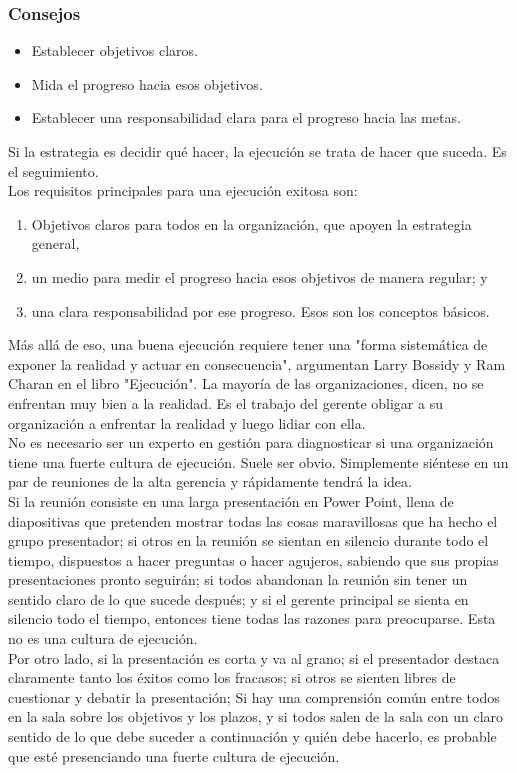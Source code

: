 \documentclass[10pt]{book}
\begin{document}
\subsubsection{Consejos}
\begin{itemize}
\item Establecer objetivos claros.
\item Mida el progreso hacia esos objetivos.
\item Establecer una responsabilidad clara para el progreso hacia las metas.
\end{itemize}
Si la estrategia es decidir qué hacer, la ejecución se trata de hacer que suceda. Es el seguimiento.\\
Los requisitos principales para una ejecución exitosa son:
\begin{enumerate}
\item Objetivos claros para todos en la organización, que apoyen la estrategia general,
\item  un medio para medir el progreso hacia esos objetivos de manera regular; y 
\item una clara responsabilidad por ese progreso. Esos son los conceptos básicos.
\end{enumerate}
Más allá de eso, una buena ejecución requiere tener una "forma sistemática de exponer la realidad y actuar en consecuencia", argumentan Larry Bossidy y Ram Charan en el libro "Ejecución". La mayoría de las organizaciones, dicen, no se enfrentan muy bien a la realidad. Es el trabajo del gerente obligar a su organización a enfrentar la realidad y luego lidiar con ella.\\
No es necesario ser un experto en gestión para diagnosticar si una organización tiene una fuerte cultura de ejecución. Suele ser obvio. Simplemente siéntese en un par de reuniones de la alta gerencia y rápidamente tendrá la idea.\\
Si la reunión consiste en una larga presentación en Power Point, llena de diapositivas que pretenden mostrar todas las cosas maravillosas que ha hecho el grupo presentador; si otros en la reunión se sientan en silencio durante todo el tiempo, dispuestos a hacer preguntas o hacer agujeros, sabiendo que sus propias presentaciones pronto seguirán; si todos abandonan la reunión sin tener un sentido claro de lo que sucede después; y si el gerente principal se sienta en silencio todo el tiempo, entonces tiene todas las razones para preocuparse. Esta no es una cultura de ejecución.\\
Por otro lado, si la presentación es corta y va al grano; si el presentador destaca claramente tanto los éxitos como los fracasos; si otros se sienten libres de cuestionar y debatir la presentación; Si hay una comprensión común entre todos en la sala sobre los objetivos y los plazos, y si todos salen de la sala con un claro sentido de lo que debe suceder a continuación y quién debe hacerlo, es probable que esté presenciando una fuerte cultura de ejecución.\\
\end{document}
